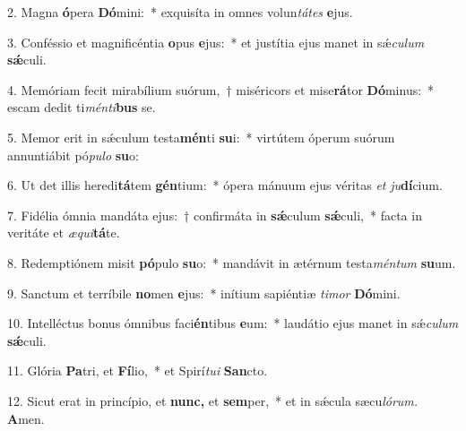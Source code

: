 \item 2. Magna \textbf{ó}pera \textbf{Dó}mini:~* exquisíta in omnes volun\textit{tátes} \textbf{e}jus.
\item 3. Conféssio et magnificéntia \textbf{o}pus \textbf{e}jus:~* et justítia ejus manet in sǽ\textit{culum} \textbf{sǽ}culi.
\item 4. Memóriam fecit mirabílium suórum,~† miséricors et mise\textbf{rá}tor \textbf{Dó}minus:~* escam dedit ti\textit{ménti}\textbf{bus} se.
\item 5. Memor erit in sǽculum testa\textbf{mén}ti \textbf{su}i:~* virtútem óperum suórum annuntiábit pó\textit{pulo} \textbf{su}o:
\item 6. Ut det illis heredi\textbf{tá}tem \textbf{gén}tium:~* ópera mánuum ejus véritas \textit{et} \textit{ju}\textbf{dí}cium.
\item 7. Fidélia ómnia mandáta ejus:~† confirmáta in \textbf{sǽ}culum \textbf{sǽ}culi,~* facta in veritáte et \textit{æqui}\textbf{tá}te.
\item 8. Redemptiónem misit \textbf{pó}pulo \textbf{su}o:~* mandávit in ætérnum testa\textit{méntum} \textbf{su}um.
\item 9. Sanctum et terríbile \textbf{no}men \textbf{e}jus:~* inítium sapiéntiæ \textit{timor} \textbf{Dó}mini.
\item 10. Intelléctus bonus ómnibus faci\textbf{én}tibus \textbf{e}um:~* laudátio ejus manet in sǽ\textit{culum} \textbf{sǽ}culi.
\item 11. Glória \textbf{Pa}tri, et \textbf{Fí}lio,~* et Spirí\textit{tui} \textbf{San}cto.
\item 12. Sicut erat in princípio, et \textbf{nunc,} et \textbf{sem}per,~* et in sǽcula sæcu\hspace{0.03em}\textit{lórum.} \textbf{A}men.